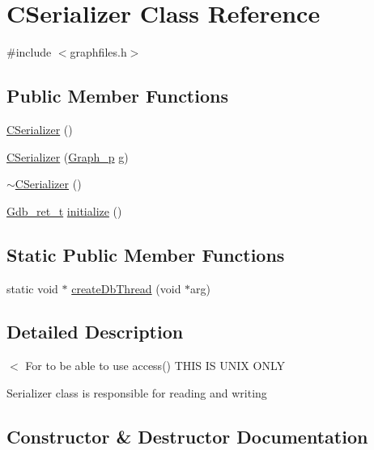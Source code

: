 \hypertarget{classCSerializer}{}\section{C\+Serializer Class Reference}
\label{classCSerializer}


{\ttfamily \#include $<$graphfiles.\+h$>$}

\subsection*{Public Member Functions}
\begin{DoxyCompactItemize}
\item 
\hyperlink{classCSerializer_a25e3382584b4df9e05079737b8ffa91b}{C\+Serializer} ()
\item 
\hyperlink{classCSerializer_a384f9efa1b05ba2394d4c50c5914ffda}{C\+Serializer} (\hyperlink{graph_8h_a5184901c75abcbef038506d943219d87}{Graph\+\_\+p} g)
\item 
\hyperlink{classCSerializer_ab4ae5e97af4a7870a66e84108bed078e}{$\sim$\+C\+Serializer} ()
\item 
\hyperlink{primitives_8h_a070061b26b3ec1c031b4ef2977e52382}{Gdb\+\_\+ret\+\_\+t} \hyperlink{classCSerializer_a450313ccd3e8ce48c222fc9ffca93c01}{initialize} ()
\end{DoxyCompactItemize}
\subsection*{Static Public Member Functions}
\begin{DoxyCompactItemize}
\item 
static void $\ast$ \hyperlink{classCSerializer_ae1f019e8eb96ad5edc33a45ac5710555}{create\+Db\+Thread} (void $\ast$arg)
\end{DoxyCompactItemize}


\subsection{Detailed Description}
$<$ For to be able to use access() T\+H\+IS IS U\+N\+IX O\+N\+LY

Serializer class is responsible for reading and writing 

\subsection{Constructor \& Destructor Documentation}

